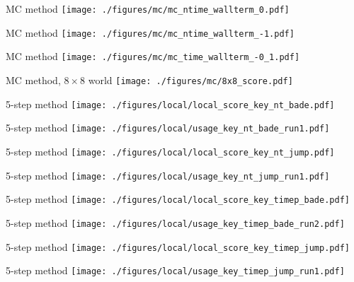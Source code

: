 \documentclass[hyperref={pdfpagelabels=false}]{beamer}
\begin{document}
\begin{frame}{MC method}
\texttt{[image: ./figures/mc/mc\_ntime\_wallterm\_0.pdf]}
\end{frame}

\begin{frame}{MC method}
\texttt{[image: ./figures/mc/mc\_ntime\_wallterm\_-1.pdf]}
\end{frame}

\begin{frame}{MC method}
\texttt{[image: ./figures/mc/mc\_time\_wallterm\_-0\_1.pdf]}
\end{frame}

\begin{frame}{MC method, $8\times8$ world}
\texttt{[image: ./figures/mc/8x8\_score.pdf]}
\end{frame}

\begin{frame}{5-step method}
\texttt{[image: ./figures/local/local\_score\_key\_nt\_bade.pdf]}
\end{frame}

\begin{frame}{5-step method}
\texttt{[image: ./figures/local/usage\_key\_nt\_bade\_run1.pdf]}
\end{frame}

\begin{frame}{5-step method}
\texttt{[image: ./figures/local/local\_score\_key\_nt\_jump.pdf]}
\end{frame}

\begin{frame}{5-step method}
\texttt{[image: ./figures/local/usage\_key\_nt\_jump\_run1.pdf]}
\end{frame}

\begin{frame}{5-step method}
\texttt{[image: ./figures/local/local\_score\_key\_timep\_bade.pdf]}
\end{frame}

\begin{frame}{5-step method}
\texttt{[image: ./figures/local/usage\_key\_timep\_bade\_run2.pdf]}
\end{frame}

\begin{frame}{5-step method}
\texttt{[image: ./figures/local/local\_score\_key\_timep\_jump.pdf]}
\end{frame}

\begin{frame}{5-step method}
\texttt{[image: ./figures/local/usage\_key\_timep\_jump\_run1.pdf]}
\end{frame}
\end{document}
